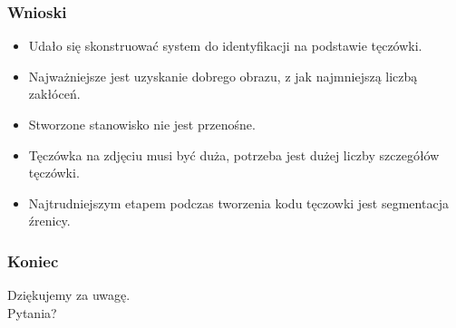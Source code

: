 \documentclass{beamer}
\begin{document}

\begin{frame}
\frametitle{Wnioski}
\begin{itemize}
\item Udało się skonstruować system do identyfikacji na podstawie tęczówki.
\item Najważniejsze jest uzyskanie dobrego obrazu, z jak najmniejszą liczbą zakłóceń.
\item Stworzone stanowisko nie jest przenośne.
\item Tęczówka na zdjęciu musi być duża, potrzeba jest dużej liczby szczegółów tęczówki.
\item Najtrudniejszym etapem podczas tworzenia kodu tęczowki jest segmentacja źrenicy.
\end{itemize}
\end{frame}

\begin{frame}
\frametitle{Koniec}

\begin{block}{}
Dziękujemy za uwagę.\\
Pytania?

\end{block}

\end{frame}

\end{document}
